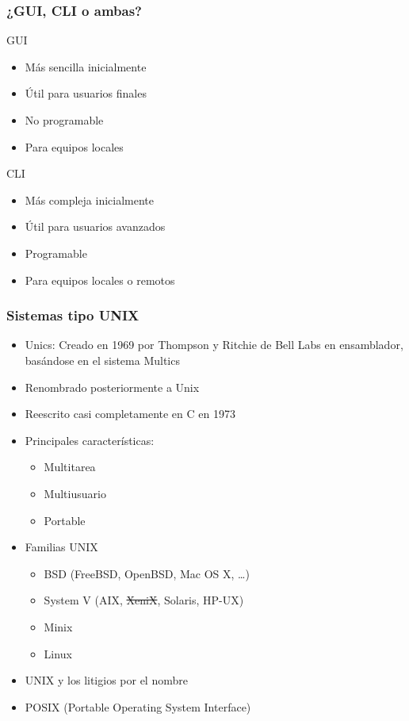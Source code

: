 \documentclass{beamer}
\begin{document}
\begin{frame}
  \frametitle{¿GUI, CLI o ambas?}
  \begin{center}
    \begin{block}{GUI}
      \begin{itemize}
      \item Más sencilla inicialmente
      \item Útil para usuarios finales
      \item No programable
      \item Para equipos locales
      \end{itemize}
    \end{block}
    \begin{block}{CLI}
      \begin{itemize}
      \item Más compleja inicialmente
      \item Útil para usuarios avanzados
      \item Programable
      \item Para equipos locales o remotos
      \end{itemize}
    \end{block}
  \end{center}

\end{frame}

\begin{frame}
  \frametitle{Sistemas tipo UNIX}
  \begin{center}
    \begin{itemize}
    \item Unics: Creado en 1969 por Thompson y Ritchie de Bell Labs en
      ensamblador, basándose en el sistema Multics
    \item Renombrado posteriormente a Unix
    \item Reescrito casi completamente en C en 1973 
    \item Principales características:
      \begin{itemize}
      \item Multitarea
      \item Multiusuario
      \item Portable
      \end{itemize}
    \item Familias UNIX
      \begin{itemize}
      \item BSD (FreeBSD, OpenBSD, Mac OS X, \ldots)
      \item System V (AIX, \sout{XeniX}, Solaris, HP-UX)
      \item Minix
      \item Linux
      \end{itemize}
    \item UNIX{\textregistered} y los litigios por el nombre
    \item POSIX (Portable Operating System Interface)
    \end{itemize}
  \end{center}
\end{frame}
\end{document}
